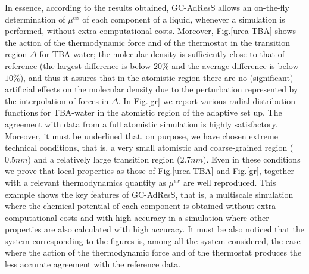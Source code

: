 \documentclass[a4paper,preprint,unsortedaddress]{revtex4-1}
\begin{document}
In essence, according to the results obtained, GC-AdResS allows an on-the-fly determination of $\mu^{ex}$ of each component of a liquid, whenever a simulation is performed, without extra computational costs.
Moreover, Fig.\ref{urea-TBA} shows the action of the thermodynamic force and of the thermostat in the transition region $\Delta$ for TBA-water; the molecular density is sufficiently close to that of reference (the largest difference is below $20\%$ and the average difference is below $10\%$), and thus it assures that in the atomistic region there are no (significant) artificial effects on the molecular density due to the perturbation represented by the interpolation of forces in $\Delta$. In Fig.\ref{gr} we report various radial distribution functions for TBA-water in the atomistic region of the adaptive set up. The agreement with data from a full atomistic simulation is highly satisfactory. Moreover, it must be underlined that, on purpose, we have chosen extreme technical conditions, that is, a very small atomistic and coarse-grained region ($0.5 nm$) and a relatively large transition region ($2.7 nm$). Even in these conditions we prove that local properties as those of Fig.\ref{urea-TBA} and Fig.\ref{gr}, together with a relevant thermodynamics quantity as $\mu^{ex}$ are well reproduced.
This example shows the key features of GC-AdResS, that is, a multiscale simulation where the chemical potential of each component is obtained without extra computational costs and with high accuracy in a simulation where other properties are also calculated with high accuracy. It must be also noticed that the system corresponding to the figures is, among all the system considered, the case where the action of the thermodynamic force and of the thermostat produces the less accurate agreement with the reference data.
\end{document}
